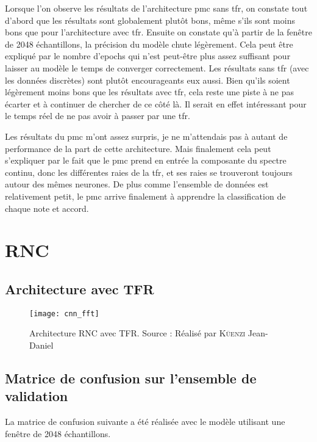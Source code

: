 Lorsque l'on observe les résultats de l'architecture \gls{pmc} sans \gls{tfr}, on constate tout d'abord que les résultats sont globalement plutôt bons, même s'ils sont moins bons que pour l'architecture avec \gls{tfr}. Ensuite on constate qu'à partir de la fenêtre de 2048 échantillons, la précision du modèle chute légèrement. Cela peut être expliqué par le nombre d'epochs qui n'est peut-être plus assez suffisant pour laisser au modèle le temps de converger correctement. Les résultats sans \gls{tfr} (avec les données discrètes) sont plutôt encourageants eux aussi. Bien qu'ils soient légèrement moins bons que les résultats avec \gls{tfr}, cela reste une piste à ne pas écarter et à continuer de chercher de ce côté là. Il serait en effet intéressant pour le temps réel de ne pas avoir à passer par une \gls{tfr}.

Les résultats du \gls{pmc} m'ont assez surpris, je ne m'attendais pas à autant de performance de la part de cette architecture. Mais finalement cela peut s'expliquer par le fait que le \gls{pmc} prend en entrée la composante du spectre continu, donc les différentes raies de la \gls{tfr}, et ses raies se trouveront toujours autour des mêmes neurones. De plus comme l'ensemble de données est relativement petit, le \gls{pmc} arrive finalement à apprendre la classification de chaque note et accord.

\section{RNC}
\label{sec:6.2}

\subsection{Architecture avec TFR}

\begin{figure}[H]
	\centering
	\texttt{[image: cnn\_fft]}
	\caption[Architecture RNC avec TFR]{Architecture RNC avec TFR. Source : Réalisé par \textsc{Küenzi} Jean-Daniel}
	\label{fig:cnn_fft}
\end{figure}

\subsection{Matrice de confusion sur l'ensemble de validation}
\label{subsec:6.2.2}

La matrice de confusion suivante a été réalisée avec le modèle utilisant une fenêtre de 2048 échantillons.

